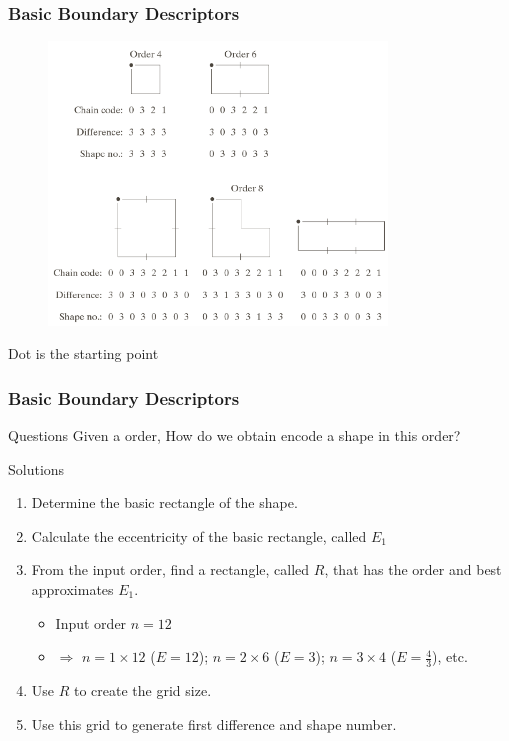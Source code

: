 \documentclass[english,11pt,table,handout]{beamer}
\begin{document}
\frame
{
	\frametitle{Basic Boundary Descriptors}
	
	\begin{figure}[!h]
		\includegraphics[width=9cm]{shape_number.png}
	\end{figure}
	Dot is the starting point
}

\frame
{
	\frametitle{Basic Boundary Descriptors}
	\begin{block}{Questions}
		Given a order, How do we obtain encode a shape in this order?
	\end{block}
	\begin{block}{Solutions}
		\begin{enumerate}
			\item Determine the basic rectangle of the shape.
			\item Calculate the eccentricity of the basic rectangle, called $E_1$
			\item From the input order, find a rectangle, called $R$, that has the order and best approximates $E_1$. 
			\begin{itemize}
				\item Input order $n=12$
				\item $\Rightarrow$ $n= 1 \times 12$ ($E=12$); $n= 2 \times 6$ ($E=3$); $n= 3 \times 4$ ($E=\frac{4}{3}$), etc.
			\end{itemize}
			\item Use $R$ to create the grid size.
			\item Use this grid to generate first difference and shape number. 
		\end{enumerate}
	\end{block}
}
\end{document}
